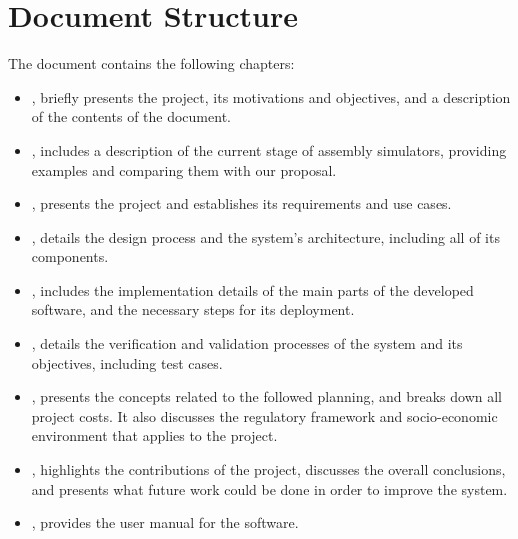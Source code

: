 \section{Document Structure}\label{sec:structure}
The document contains the following chapters:
\begin{itemize}
  \item {}, briefly presents the project, its motivations and objectives, and a description of the contents of the document.
  \item {}, includes a description of the current stage of \gls{assembly} simulators, providing examples and comparing them with our proposal.
  \item {}, presents the project and establishes its requirements and use cases.
  \item {}, details the design process and the system's architecture, including all of its components.
  \item {}, includes the implementation details of the main parts of the developed software, and the necessary steps for its deployment.
  \item {}, details the verification and validation processes of the system and its objectives, including test cases.
  \item {}, presents the concepts related to the followed planning, and  breaks down all project costs. It also discusses the regulatory framework and socio-economic environment that applies to the project.
  \item {}, highlights the contributions of the project, discusses the overall conclusions, and presents what future work could be done in order to improve the system.
  \item {}, provides the user manual for the software.
\end{itemize}